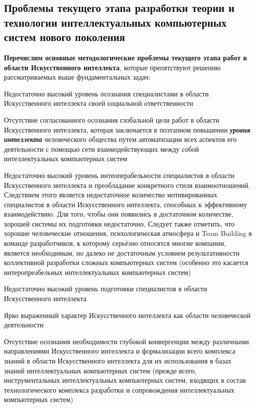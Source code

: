 \subsection*{Проблемы текущего этапа разработки теории и технологии интеллектуальных компьютерных систем нового поколения}
\textbf{Перечислим основные методологические проблемы текущего этапа работ в области Искусственного интеллекта}, которые препятствуют решению рассматриваемых выше фундаментальных задач:
\begin{textitemize}
	\item 
	Недостаточно высокий уровень осознания специалистами в области Искусственного интеллекта своей социальной ответственности
	\item 
	Отсутствие согласованного осознания глобальной цели работ в области Искусственного интеллекта, которая заключается в поэтапном повышении \textbf{\textit{уровня интеллекта}} человеческого общества путем  автоматизации всех аспектов его деятельности с помощью сети взаимодействующих между собой интеллектуальных компьютерных систем
	\item 
	Недостаточно высокий уровень интеоперабельности специалистов в области Искусственного интеллекта и преобладание конкретного стиля взаимоотношений. Следствием этого является недостаточное количество мотивированных специалистов в области Искусственного интеллекта, способных к эффективному  взаимодействию. Для того, чтобы они появились в достаточном количестве, хорошей системы их  подготовки недостаточно. Следует также отметить, что хорошие человеческие отношения, психологическая атмосфера и Team Building в команде разработчиков, к которому серьёзно относятся многие компании, является необходимым, но далеко не достаточным условием результативности коллективной разработки сложных компьютерных систем (особенно это касается интеропреабельных интеллектуальных компьютерных систем)
	\item 
	Недостаточно высокий уровень  подготовки специалистов в области Искусственного интеллекта
	\item 
	Ярко выраженный  характер Искусственного интеллекта как области человеческой деятельности
	\item 
	Отсутствие осознания необходимости глубокой конвергенции между различными направлениями Искусственного интеллекта и формализации всего комплекса знаний в области Искусственного интеллекта для их использования в базах знаний интеллектуальных компьютерных систем (прежде всего, инструментальных интеллектуальных компьютерных систем, входящих в состав технологического комплекса разработки и сопровождения интеллектуальных компьютерных систем)

\end{textitemize}
